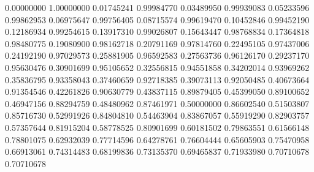 0.00000000 
1.00000000 
0.01745241 
0.99984770 
0.03489950 
0.99939083 
0.05233596 
0.99862953 
0.06975647 
0.99756405 
0.08715574 
0.99619470 
0.10452846 
0.99452190 
0.12186934 
0.99254615 
0.13917310 
0.99026807 
0.15643447 
0.98768834 
0.17364818 
0.98480775 
0.19080900 
0.98162718 
0.20791169 
0.97814760 
0.22495105 
0.97437006 
0.24192190 
0.97029573 
0.25881905 
0.96592583 
0.27563736 
0.96126170 
0.29237170 
0.95630476 
0.30901699 
0.95105652 
0.32556815 
0.94551858 
0.34202014 
0.93969262 
0.35836795 
0.93358043 
0.37460659 
0.92718385 
0.39073113 
0.92050485 
0.40673664 
0.91354546 
0.42261826 
0.90630779 
0.43837115 
0.89879405 
0.45399050 
0.89100652 
0.46947156 
0.88294759 
0.48480962 
0.87461971 
0.50000000 
0.86602540 
0.51503807 
0.85716730 
0.52991926 
0.84804810 
0.54463904 
0.83867057 
0.55919290 
0.82903757 
0.57357644 
0.81915204 
0.58778525 
0.80901699 
0.60181502 
0.79863551 
0.61566148 
0.78801075 
0.62932039 
0.77714596 
0.64278761 
0.76604444 
0.65605903 
0.75470958 
0.66913061 
0.74314483 
0.68199836 
0.73135370 
0.69465837 
0.71933980 
0.70710678 
0.70710678 
